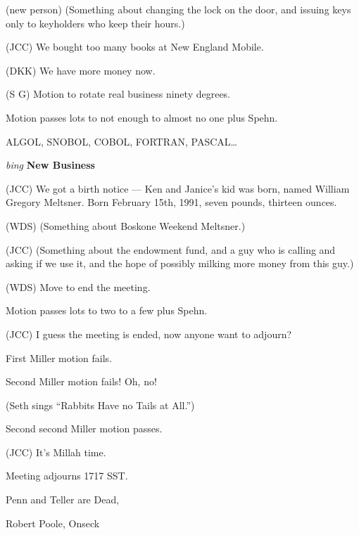 (new person)  (Something about changing the lock on the door, and issuing keys
only to keyholders who keep their hours.)

(JCC) We bought too many books at New England Mobile.

(DKK) We have more money now.

(S G) Motion to rotate real business ninety degrees.

Motion passes lots to not enough to almost no one plus Spehn.

ALGOL, SNOBOL, COBOL, FORTRAN, PASCAL\ldots

\vspace{0.15in}
{\em bing\/} {\bf New Business\/}

(JCC) We got a birth notice --- Ken and Janice's kid was born, named William
Gregory Meltsner.  Born February 15th, 1991, seven pounds, thirteen ounces.

(WDS) (Something about Boskone Weekend Meltsner.)

(JCC) (Something about the endowment fund, and a guy who is calling and asking
if we use it, and the hope of possibly milking more money from this guy.)

(WDS) Move to end the meeting.

Motion passes lots to two to a few plus Spehn.

(JCC) I guess the meeting is ended, now anyone want to adjourn?

First Miller motion fails.

Second Miller motion fails!  Oh, no!

(Seth sings ``Rabbits Have no Tails at All.'')

Second second Miller motion passes.

(JCC) It's Millah time.

Meeting adjourns 1717 SST.

\vspace{0.15in}
\begin{center}
Penn and Teller are Dead,

Robert Poole, Onseck
\end{center}

